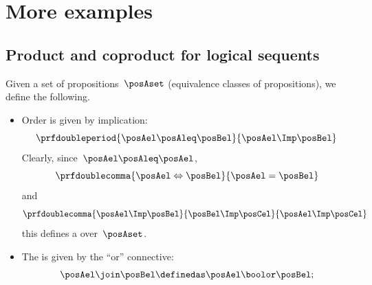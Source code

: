 
\section{More examples}


\subsection{Product and coproduct for logical sequents}



\begin{ctdefinition}
    \label{def:prop-as-lattice}
    Given a set of propositions~$\posAset$ (equivalence classes of propositions), we define the following.
    \begin{itemize}
        \item Order is given by implication:
              \begin{equation}
                  \prfdoubleperiod{
                      \posAel\posAleq \posBel
                  }{
                      \posAel \Imp \posBel
                  }
              \end{equation}
              Clearly, since~$\posAel \posAleq \posAel$,
              \begin{equation}
                  \prfdoublecomma{
                      \posAel \Leftrightarrow \posBel
                  }{
                      \posAel =\posBel
                  }
              \end{equation}
              and
              \begin{equation}
                  \prfdoublecomma{
                      \posAel \Imp \posBel
                  }{
                      \posBel \Imp \posCel
                  }{
                      \posAel \Imp \posCel
                  }
              \end{equation}
              this defines a  over~$\posAset$.
        \item The  is given by the ``or'' connective:
              \begin{equation}
                  \posAel \join \posBel \definedas \posAel \boolor \posBel;
              \end{equation}

\end{itemize}
\end{ctdefinition}
